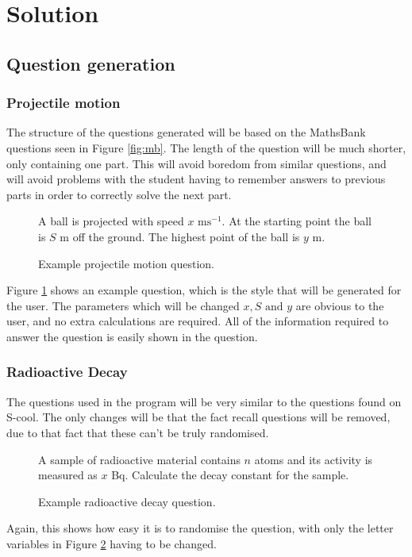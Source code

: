 \section{Solution}
\subsection{Question generation}
\subsubsection{Projectile motion}
The structure of the questions generated will be based on the MathsBank questions seen in Figure \ref{fig:mb}. The length of the question will be much shorter, only containing one part. This will avoid boredom from similar questions, and will avoid problems with the student having to remember answers to previous parts in order to correctly solve the next part. 
\begin{figure}[h]
	\centering
	A ball is projected with speed \(x \text{ ms}^{-1}
	\). At the starting point the ball is \(S\) m off the ground. The highest point of the ball is \(y\)  m.
	\caption{Example projectile motion question.}
	\label{expm}
\end{figure}
Figure \ref{expm} shows an example question, which is the style that will be generated for the user. The parameters which will be changed \(x, S \text{ and } y\) are obvious to the user, and no extra calculations are required. All of the information required to answer the question is easily shown in the question.
\subsubsection{Radioactive Decay}
The questions used in the program will be very similar to the questions found on S-cool\autocite{scool}. The only changes will be that the fact recall questions will be removed, due to that fact that these can't be truly randomised.
\begin{figure}[h]
	\centering
	A sample of radioactive material contains \(n\) atoms and its activity is measured as \(x\) Bq. Calculate the decay constant for the sample.
	\caption{Example radioactive decay question.}
	\label{exrd}
\end{figure}

Again, this shows how easy it is to randomise the question, with only the letter variables in Figure \ref{exrd} having to be changed.

